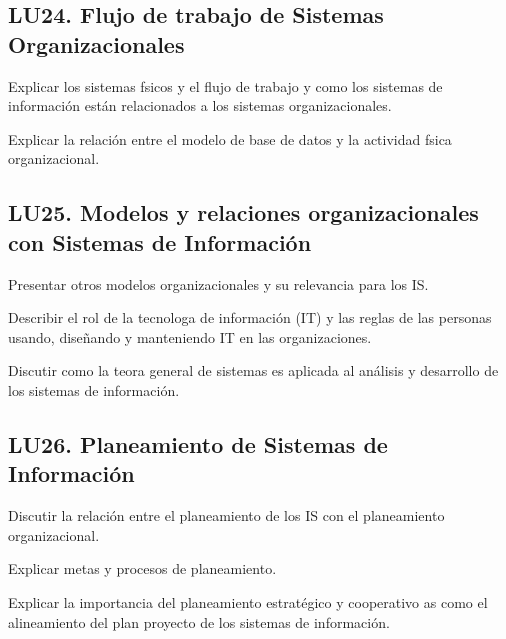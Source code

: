 \subsection{LU24. Flujo de trabajo de Sistemas Organizacionales}\label{sec:LU24}
\begin{LearningUnit}
\begin{LUGoal}
\item Explicar los sistemas f­sicos y el flujo de trabajo y como los sistemas de información están relacionados a los sistemas organizacionales.
\end{LUGoal}

\begin{LUObjective}
\item Explicar la relación entre el modelo de base de datos   y la actividad f­sica organizacional.
\end{LUObjective}
\end{LearningUnit}

\subsection{LU25. Modelos y relaciones organizacionales con Sistemas de Información}\label{sec:LU25}
\begin{LearningUnit}
\begin{LUGoal}
\item Presentar otros modelos organizacionales  y su relevancia para los IS.
\end{LUGoal}

\begin{LUObjective}
\item Describir el rol de la tecnolog­a de información (IT) y las reglas de las personas usando, diseñando y manteniendo IT en las organizaciones.
\item Discutir como la teor­a general de sistemas es aplicada al análisis y desarrollo de los sistemas de información.
\end{LUObjective}
\end{LearningUnit}

\subsection{LU26. Planeamiento de Sistemas de Información}\label{sec:LU26}
\begin{LearningUnit}
\begin{LUGoal}
\item Discutir la relación  entre el planeamiento de los IS  con el planeamiento organizacional.
\end{LUGoal}

\begin{LUObjective}
\item Explicar metas y procesos de planeamiento.
\item Explicar la importancia del planeamiento estratégico  y cooperativo  as­ como el alineamiento del plan proyecto de los sistemas de información.
\end{LUObjective}
\end{LearningUnit}

